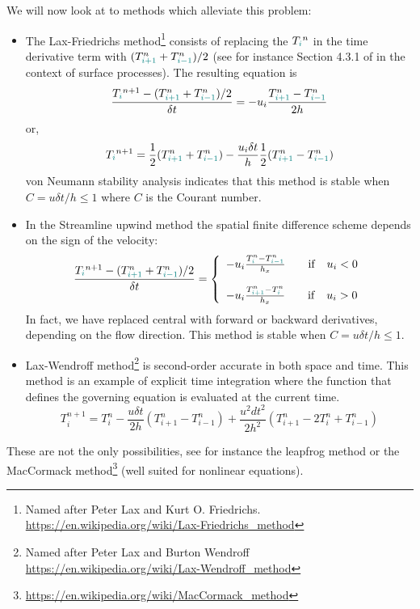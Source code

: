 We will now look at to methods which alleviate this problem:

\begin{itemize}
\item The {\color{olive} Lax-Friedrichs method}\footnote{Named after Peter Lax 
and Kurt O. Friedrichs. \url{https://en.wikipedia.org/wiki/Lax-Friedrichs_method}} consists of replacing the $T_{\color{teal}i}^n$ 
in the time derivative term with $(T_{{\color{teal}i+1}}^n + T_{{\color{teal}i-1}}^n)/2$
(see for instance Section 4.3.1 of \cite{pell08} in the context of surface processes). 
The resulting equation is
\[
\frac{T_{\color{teal}i}^{n+1}-  (T_{{\color{teal}i+1}}^n + T_{{\color{teal}i-1}}^n)/2 }{\delta t} 
= - u_i \frac{T^n_{{\color{teal}i+1}}-T^n_{{\color{teal}i-1}}}{2 h}
\]
or, 
\[
T_{\color{teal}i}^{n+1} = \frac{1}{2} (T_{{\color{teal}i+1}}^n + T_{{\color{teal}i-1}}^n)  
- \frac{u_i \delta t}{h}  \frac{1}{2} (T^n_{{\color{teal}i+1}}-T^n_{{\color{teal}i-1}})
\]
von Neumann stability analysis indicates that this method is stable
when $C=u \delta t/h \leq 1$ where $C$ is the Courant number.
\item In the {\color{olive}Streamline upwind} method the spatial finite difference scheme 
depends on the sign of the velocity:
\[
\frac{T_{\color{teal}i}^{n+1}-  (T_{{\color{teal}i+1}}^n + T_{{\color{teal}i-1}}^n)/2   }{\delta t} =
\left\{
\begin{array}{l}
 - u_i \frac{T^n_{{\color{teal}i}}-T^n_{{\color{teal}i-1}}}{h_x}  \quad\quad  {\rm if} \quad u_i<0\\ \\
 - u_i \frac{T^n_{{\color{teal}i+1}}-T^n_{{\color{teal}i}}}{h_x}  \quad\quad  {\rm if} \quad u_i>0
\end{array}
\right.
\]
In fact, we have replaced central with forward or backward derivatives, depending on the flow direction. 
This method is stable when $C=u \delta t/h \leq 1$. 

\item {\color{olive} Lax-Wendroff method}\footnote{Named after Peter Lax 
and Burton Wendroff \url{https://en.wikipedia.org/wiki/Lax-Wendroff_method}} \cite{hoch}
is second-order accurate in both space and time. 
This method is an example of explicit time integration where the function that defines the governing equation is evaluated at the current time. 
\[
T^{n+1}_i = T_i^n - \frac{u \delta t}{2 h} (T_{i+1}^n-T_{i-1}^n)
+ \frac{u^2 dt^2}{2 h^2} (T_{i+1}^n-2 T_i^n+T_{i-1}^n)
\]








\end{itemize}
These are not the only possibilities, see for instance 
the {\color{olive} leapfrog method} or the
MacCormack method\footnote{\url{https://en.wikipedia.org/wiki/MacCormack_method}} (well suited for nonlinear equations).  




